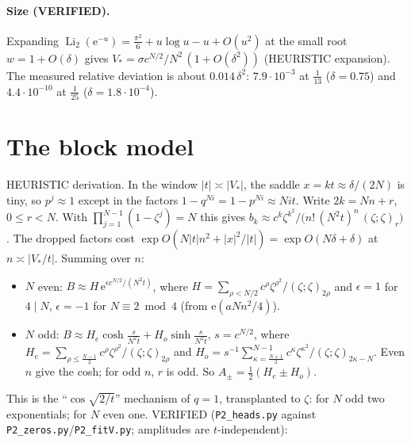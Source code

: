 \documentclass[11pt]{article}
\theoremstyle{remark}\newtheorem{remark}[theorem]{Remark}
\newcommand{\e}{\mathrm{e}}
\newcommand{\Li}{\operatorname{Li}_2}
\begin{document}
\paragraph{Size (VERIFIED).} Expanding $\Li(\e^{-u})=\frac{\pi^2}6+u\log u-u+O(u^2)$ at the small root $w=1+O(\delta)$ gives
$V_*=\sigma c^{N/2}/N^2\,(1+O(\delta^2))$ (HEURISTIC expansion). The measured relative deviation is about $0.014\,\delta^2$:
$7.9\cdot10^{-3}$ at $\frac1{13}$ ($\delta=0.75$) and $4.4\cdot10^{-10}$ at $\frac1{25}$ ($\delta=1.8\cdot10^{-4}$).

\section{The block model}\label{sec:model}
HEURISTIC derivation. In the window $|t|\asymp|V_*|$, the saddle $x=kt\approx\delta/(2N)$ is tiny, so $p^j\approx1$ except in the
factors $1-q^{Ni}=1-p^{Ni}\approx Nit$. Write $2k=Nn+r$, $0\le r<N$. With $\prod_{j=1}^{N-1}(1-\zeta^j)=N$ this gives
$b_k\approx c^k\zeta^{k^2}/\big(n!\,(N^2t)^n\,(\zeta;\zeta)_r\big)$. The dropped factors cost $\exp O(N|t|n^2+|x|^2/|t|)=\exp O(N\delta+\delta)$ at $n\asymp|V_*/t|$.
Summing over $n$:
\begin{itemize}
\item $N$ even: $B\approx H\,\e^{\epsilon c^{N/2}/(N^2t)}$, where $H=\sum_{\rho<N/2}c^\rho\zeta^{\rho^2}/(\zeta;\zeta)_{2\rho}$ and
$\epsilon=1$ for $4\mid N$, $\epsilon=-1$ for $N\equiv2\bmod4$ (from $\e(aNn^2/4)$).
\item $N$ odd: $B\approx H_e\cosh\frac{s}{N^2t}+H_o\sinh\frac{s}{N^2t}$, $s=c^{N/2}$, where $H_e=\sum_{\rho\le\frac{N-1}2}c^\rho\zeta^{\rho^2}/(\zeta;\zeta)_{2\rho}$
and $H_o=s^{-1}\sum_{\kappa=\frac{N+1}2}^{N-1}c^\kappa\zeta^{\kappa^2}/(\zeta;\zeta)_{2\kappa-N}$. Even $n$ give the cosh; for odd $n$, $r$ is odd.
So $A_\pm=\frac12(H_e\pm H_o)$.
\end{itemize}
This is the ``$\cos\sqrt{2/t}$'' mechanism of $q=1$, transplanted to $\zeta$: for $N$ odd two exponentials; for $N$ even one.
VERIFIED (\texttt{P2\_heads.py} against \texttt{P2\_zeros.py}/\texttt{P2\_fitV.py}; amplitudes are $t$-independent):
\end{document}
